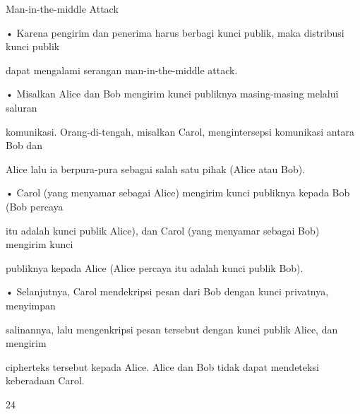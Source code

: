 \documentclass{article}
\begin{document}

Man-in-the-middle Attack

• Karena pengirim dan penerima harus berbagi kunci publik, maka distribusi kunci publik 

dapat mengalami serangan man-in-the-middle attack. 

• Misalkan Alice dan Bob mengirim kunci publiknya masing-masing melalui saluran 

komunikasi. Orang-di-tengah, misalkan Carol, mengintersepsi komunikasi antara Bob dan 

Alice lalu ia berpura-pura sebagai salah satu pihak (Alice atau Bob). 

• Carol (yang menyamar sebagai Alice) mengirim kunci publiknya kepada Bob (Bob percaya 

itu adalah kunci publik Alice), dan Carol (yang menyamar sebagai Bob) mengirim kunci 

publiknya kepada Alice (Alice percaya itu adalah kunci publik Bob). 

• Selanjutnya, Carol mendekripsi pesan dari Bob dengan kunci privatnya, menyimpan 

salinannya, lalu mengenkripsi pesan tersebut dengan kunci publik Alice, dan mengirim 

cipherteks tersebut kepada Alice. Alice dan Bob tidak dapat mendeteksi keberadaan Carol.

24
\end{document}
